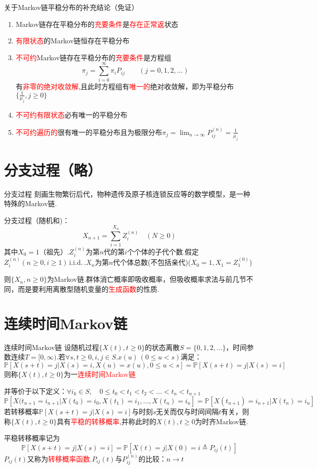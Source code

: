 \documentclass{elegantbook}
\newcommand\iid{\,\text{i.i.d.}\,}
\newcommand\p{\mathbb{P}}
\begin{document}
\begin{note}
    关于Markov链平稳分布的补充结论（免证）
    \begin{enumerate}
        \item Markov链存在平稳分布的\textcolor{red}{充要条件}是\textcolor{red}{存在正常返}状态
        \item \textcolor{red}{有限状态}的Markov链恒存在平稳分布
        \item \textcolor{red}{不可约}Markov链存在平稳分布的\textcolor{red}{充要条件}是方程组\[\pi _j=\sum_{i=0}^{\infty}\pi _iP_{ij}\qquad (j=0,1,2,\dots )\]
              有\textcolor{red}{非零的绝对收敛解},且此时方程组有\textcolor{red}{唯一的}绝对收敛解，即为平稳分布$\{\frac{1}{\mu _j},j\geq 0\}$
        \item \textcolor{red}{不可约有限状态}必有唯一的平稳分布
        \item \textcolor{red}{不可约遍历的}很有唯一的平稳分布且为极限分布$\pi _j=\lim_{n \to \infty}P_{ij}^{(n)}=\frac{1}{\mu _j}$
    \end{enumerate}
\end{note}

\section{分支过程（略）}
\begin{definition}{分支过程}{}
    刻画生物繁衍后代，物种遗传及原子核连锁反应等的数学模型，是一种特殊的Markov链.
    \par 分支过程（随机和)：\[X_{n+1}=\sum_{i=1}^{X_n}Z_i^{(n)}\quad (N\geq 0)\]
    其中$X_0=1$（祖先）.$Z_i^{(n)}$为第$n$代的第$i$个个体的子代个数.假定$Z_i^{(n)}(n\geq 0,i\geq 1)\iid $.$X_n$为第$n$代个体总数(不包括亲代)($X_0=1,X_1=Z_1^{(0)}$)
    \par 则$\{X_n,n\geq 0\}$为Markov链.群体消亡概率即吸收概率，但吸收概率求法与前几节不同，而是要利用离散型随机变量的\textcolor{red}{生成函数}的性质.
\end{definition}

\section{连续时间Markov链}
\begin{definition}{连续时间Markov链}{}
    设随机过程$\{X(t),t\geq 0 \}$的状态离散$S=\{0,1,2,\dots\}$，时间参数连续$T=[0,\infty)$.若$\forall s,t\geq 0 ,i,j\in S.x(u)\, (0\leq u<s)$满足：
    \[\p[X(s+t)=j|X(s)=i,X(u)=x(u),0\leq u<s]=\p[X(s+t)=j|X(s)=i]\]
    则称$\{X(t),t\geq 0\}$为一\textcolor{red}{连续时间Markov链}
    \par 并等价于以下定义：$\forall i_k\in S,\quad  0\leq t_0<t_1<t_2<\dots <t_n<t_{n+1}$
    \[\p[X(t_{n+1}=i_{n+1}|X(t_0)=i_0,X(t_1)=i_1,\dots ,X(t_n)=i_n]=\p[X(t_{n+1})=i_{n+1}|X(t_n)=i_n]\]
    若转移概率$\p[X(s+t)=j|X(s)=i]$与时刻$s$无关而仅与时间间隔$t$有关，则称$\{X(t),t\geq 0\}$具有\textcolor{red}{平稳的转移概率},并称此时的$X(t),t\geq 0$为时齐Markov链.
    \par 平稳转移概率记为\[\p[X(s+t)=j|X(s)=i]=\p[X(t)=j|X(0)=i\triangleq P_{ij}(t)]\]
    $P_{ij}(t)$又称为\textcolor{red}{转移概率函数}.$P_{ij}(t)$与$P_{ij}^{(n)}$的比较：$n \to t$
\end{definition}
\end{document}
